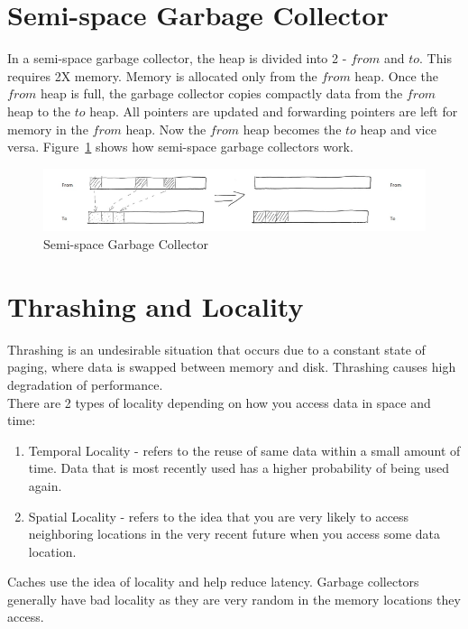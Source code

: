 \documentclass[twoside]{article}
\begin{document}
\section{Semi-space Garbage Collector}
In a semi-space garbage collector, the heap is divided into 2 - $from$ and $to$. This requires 2X memory. Memory is allocated only from the $from$ heap. Once the $from$ heap is full, the garbage collector copies compactly data from the $from$ heap to the $to$ heap. All pointers are updated and forwarding pointers are left for memory in the $from$ heap. Now the $from$ heap becomes the $to$ heap and vice versa. Figure~\ref{fig:semispace} shows how semi-space garbage collectors work.
\begin{figure}[h]
\centering
\includegraphics[scale=0.5]{semispace}
\caption{Semi-space Garbage Collector \label{fig:semispace}}
\end{figure}
\section{Thrashing and Locality}
Thrashing is an undesirable situation that occurs due to a constant state of paging, where data is swapped between memory and disk. Thrashing causes high degradation of performance.\\

There are 2 types of locality depending on how you access data in space and time:
\begin{enumerate}
\item Temporal Locality - refers to the reuse of same data within a small amount of time. Data that is most recently used has a higher probability of being used again.
\item Spatial Locality - refers to the idea that you are very likely to access neighboring locations in the very recent future when you access some data location.
\end{enumerate}
Caches use the idea of locality and help reduce latency. Garbage collectors generally have bad locality as they are very random in the memory locations they access.
\end{document}
